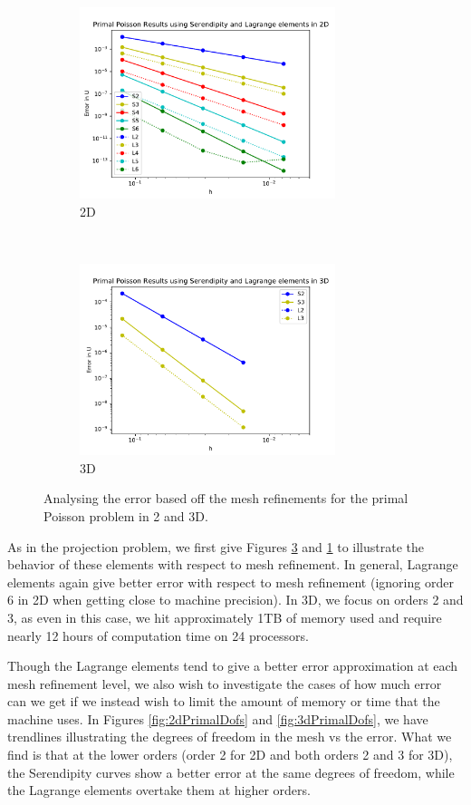 \documentclass[manuscript,screen]{acmart}
\begin{document}
\begin{figure}[h!]
  \centering
  \begin{subfigure}[h]{0.5\textwidth}
    \centering
    \includegraphics[height=2.2in]{2dPrimalH.pdf}
    \caption{2D}
    \label{fig:2dPrimalH}
  \end{subfigure}
  ~
  \begin{subfigure}[h]{0.5\textwidth}
    \centering
    \includegraphics[height=2.2in]{3dPrimalH.pdf}
    \caption{3D}
    \label{fig:3dPrimalH}
  \end{subfigure}
  \caption{Analysing the error based off the mesh refinements for the primal Poisson problem in 2 and 3D.}
\end{figure}  
\noindent  As in the projection problem, we first give Figures \ref{fig:3dPrimalH} and \ref{fig:2dPrimalH} to illustrate the behavior of these elements with respect to mesh refinement.  In general, Lagrange elements again give better error with respect to mesh refinement (ignoring order 6 in 2D when getting close to machine precision).  In 3D, we focus on orders 2 and 3, as even in this case, we hit approximately 1TB of memory used and require nearly 12 hours of computation time on 24 processors.

\noindent Though the Lagrange elements tend to give a better error approximation at each mesh refinement level, we also wish to investigate the cases of how much error can we get if we instead wish to limit the amount of memory or time that the machine uses.  In Figures \ref{fig:2dPrimalDofs} and \ref{fig:3dPrimalDofs}, we have trendlines illustrating the degrees of freedom in the mesh vs the error.  What we find is that at the lower orders (order 2 for 2D and both orders 2 and 3 for 3D), the Serendipity curves show a better error  at the same degrees of freedom, while the Lagrange elements overtake them at higher orders.  
\end{document}

